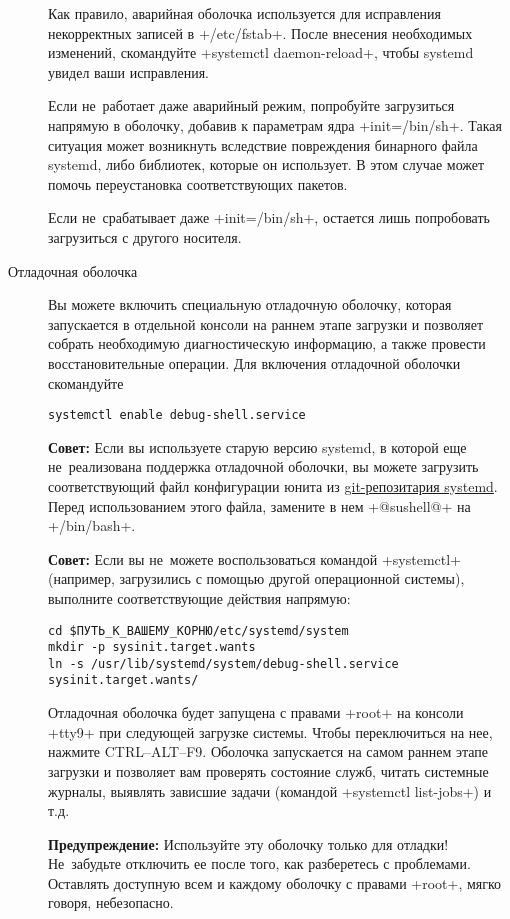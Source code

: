 \documentclass[10pt,oneside,a4paper]{article}
\begin{document}
\begin{description}
	Как правило, аварийная оболочка используется для исправления
	некорректных записей в +/etc/fstab+. После внесения необходимых
	изменений, скомандуйте +systemctl daemon-reload+, чтобы systemd увидел
	ваши исправления.

	Если не~работает даже аварийный режим, попробуйте загрузиться напрямую в
	оболочку, добавив к параметрам ядра +init=/bin/sh+. Такая ситуация может
	возникнуть вследствие повреждения бинарного файла systemd, либо
	библиотек, которые он использует. В этом случае может помочь
	переустановка соответствующих пакетов.

	Если не~срабатывает даже +init=/bin/sh+, остается лишь попробовать
	загрузиться с другого носителя.

\item[Отладочная оболочка]\hypertarget{it:dbgshell}{}
	Вы можете включить специальную отладочную оболочку, которая запускается
	в отдельной консоли на раннем этапе загрузки и позволяет собрать
	необходимую диагностическую информацию, а также провести
	восстановительные операции. Для включения отладочной оболочки
	скомандуйте
\begin{Verbatim}
systemctl enable debug-shell.service
\end{Verbatim}
	
	\textbf{Совет:} Если вы используете старую версию systemd, в которой еще
	не~реализована поддержка отладочной оболочки, вы можете загрузить
	соответствующий файл конфигурации юнита из
	\href{http://cgit.freedesktop.org/systemd/systemd/plain/units/debug-shell.service.in}{git-репозитария
	systemd}. Перед использованием этого файла, замените в нем +@sushell@+
	на +/bin/bash+.

	\textbf{Совет:} Если вы не~можете воспользоваться командой +systemctl+
	(например, загрузились с помощью другой операционной системы),
	выполните соответствующие действия напрямую:
\begin{Verbatim}
cd $ПУТЬ_К_ВАШЕМУ_КОРНЮ/etc/systemd/system
mkdir -p sysinit.target.wants
ln -s /usr/lib/systemd/system/debug-shell.service sysinit.target.wants/
\end{Verbatim}
	
	Отладочная оболочка будет запущена с правами +root+ на консоли +tty9+
	при следующей загрузке системы. Чтобы переключиться на нее, нажмите
	CTRL--ALT--F9. Оболочка запускается на самом раннем этапе загрузки и
	позволяет вам проверять состояние служб, читать системные журналы,
	выявлять зависшие задачи (командой +systemctl list-jobs+) и т.д.

	\textbf{Предупреждение:} Используйте эту оболочку только для отладки!
	Не~забудьте отключить ее после того, как разберетесь с проблемами.
	Оставлять доступную всем и каждому оболочку с правами +root+, мягко
	говоря, небезопасно.


\end{description}
\end{document}
